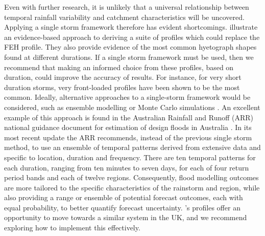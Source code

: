 \documentclass[APA,Times2COL]{WileyNJDv5}
\begin{document}
Even with further research, it is unlikely that a universal relationship between temporal rainfall variability and catchment characteristics will be uncovered. Applying a single storm framework therefore has evident shortcomings. \citet{villalobos2023towards} illustrate an evidence-based approach to deriving a suite of profiles which could replace the FEH profile. They also provide evidence of the most common hyetograph shapes found at different durations. If a single storm framework must be used, then we recommend that making an informed choice from these profiles, based on duration, could improve the accuracy of results. For instance, for very short duration storms, very front-loaded profiles have been shown to be the most common. Ideally, alternative approaches to a single-storm framework would be considered, such as ensemble modelling or Monte Carlo simulations \citep{nathan2003use}. An excellent example of this approach is found in the Australian Rainfall and Runoff (ARR) national guidance document for estimation of design floods in Australia \citep{ball2019australian}. In its most recent update the ARR recommends, instead of the previous single storm method, to use an ensemble of temporal patterns derived from extensive data and specific to location, duration and frequency. There are ten temporal patterns for each duration, ranging from ten minutes to seven days, for each of four return period bands and each of twelve regions. Consequently, flood modelling outcomes are more tailored to the specific characteristics of the rainstorm and region, while also providing a range or ensemble of potential forecast outcomes, each with equal probability, to better quantify forecast uncertainty. \citet{villalobos2023towards}'s profiles offer an opportunity to move towards a similar system in the UK, and we recommend exploring how to implement this effectively.

\end{document}
